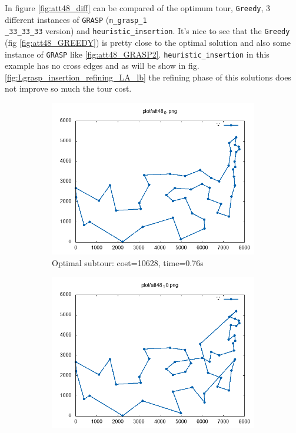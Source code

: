In figure \ref{fig:att48_diff} can be compared of the optimum tour, \texttt{Greedy}, 3 different instances of \texttt{GRASP} (\texttt{n\_grasp\_1 \\ \_33\_33\_33} version) and \texttt{heuristic\_insertion}. It's nice to see that the \texttt{Greedy} (fig \ref{fig:att48_GREEDY}) is pretty close to the optimal solution and also some instance of \texttt{GRASP} like \ref{fig:att48_GRASP2}. \texttt{heuristic\_insertion} in this example has no cross edges and as will be show in fig. \ref{fig:Lgrasp_insertion_refining_LA_lb} the refining phase of this solutions does not improve so much the tour cost.
\begin{figure}[!h]
	\begin{subfigure}{.49\textwidth}
		\centering
		\includegraphics[width=\columnwidth]{../res/att48_0.png}
		\caption{Optimal subtour: cost=10628, time=0.76s}
		\label{fig:att48_best}
	\end{subfigure}
	\begin{subfigure}{.49\textwidth}
		\centering
		\includegraphics[width=\columnwidth]{../res/att48_10.png}

\end{subfigure}
\end{figure}
